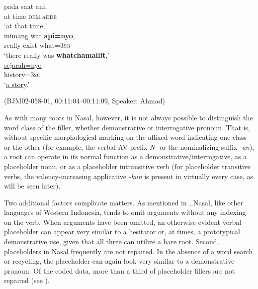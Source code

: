 \documentclass[output=paper,colorlinks,citecolor=brown
\ChapterDOI{10.5281/zenodo.15697585}
]{langscibook}
\begin{document}
\begin{exe}
    \ex\label{ex:api-intro-place} \begin{xlist}[0\quad →A:]
         \gll
        pada saat ani, \\
        at time \textsc{dem.addr} \\
        \glt `at that time,' \\
         \gll
        mimang wat \textbf{api=nyo}, \\
        really exist what=3\textsc{sg} \\
        \glt `there really was \textbf{whatchamallit},' \\
        \exi{3\quad \hphantom{→A:}} \gll
        \uline{sejarah=nyo} \\
        history=3\textsc{sg} \\
        \glt `\uline{a story}.' \\
    \end{xlist}
    \hfill (BJM02-058-01, 00:11:04–00:11:09, Speaker: Ahmad) 
\end{exe}

As with many roots in Nasal, however, it is not always possible to distinguish the word class of the filler, whether demonstrative or interrogative pronoun. That is, without specific morphological marking on the affixed word indicating one class or the other (for example, the verbal AV prefix \textit{N-} or the nominalizing suffix \textit{-an}), a root can operate in its normal function as a demonstrative\slash interrogative, as a placeholder noun, or as a placeholder intransitive verb (for placeholder transitive verbs, the valency\hyp increasing applicative \textit{-kun} is present in virtually every case, as will be seen later).

Two additional factors complicate matters. As mentioned in , Nasal, like other languages of Western Indonesia, tends to omit arguments without any indexing on the verb. When arguments have been omitted, an otherwise evident verbal placeholder can appear very similar to a hesitator or, at times, a prototypical demonstrative use, given that all three can utilize a bare root. Second, placeholders in Nasal frequently are not repaired. In the absence of a word search or recycling, the placeholder can again look very similar to a demonstrative pronoun. Of the coded data, more than a third of placeholder fillers are not repaired (see ).
\end{document}
